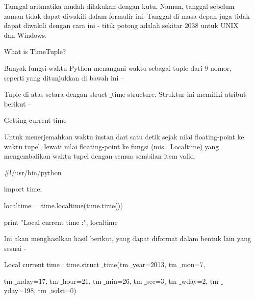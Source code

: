 \vspace{12pt}
\noindent 
Tanggal aritmatika mudah dilakukan dengan kutu. Namun, tanggal sebelum zaman tidak dapat diwakili dalam formulir ini. Tanggal di masa depan juga tidak dapat diwakili dengan cara ini - titik potong adalah sekitar 2038 untuk UNIX dan Windows. \par
\vspace{12pt}
\vspace{12pt}
\noindent 
What is TimeTuple? \par
\vspace{12pt}
\noindent 
Banyak fungsi waktu Python menangani waktu sebagai tuple dari 9 nomor, seperti yang ditunjukkan di bawah ini – \par
\vspace{12pt}
\noindent 
Tuple di atas setara dengan struct $  \_  $time structure. Struktur ini memiliki atribut berikut – \par
\vspace{12pt}
\noindent 
Getting current time \par
\noindent 
 \hspace*{0.5in} Untuk menerjemahkan waktu instan dari satu detik sejak nilai floating-point ke waktu tupel, lewati nilai floating-point ke fungsi (mis., Localtime) yang mengembalikan waktu tupel dengan semua sembilan item valid. \par
\vspace{12pt}
\noindent 
 \hspace*{0.5in}  $  \#  $!/usr/bin/python \par
\noindent 
 \hspace*{0.5in} import time; \par
\vspace{12pt}
\noindent 
 \hspace*{0.5in} localtime = time.localtime(time.time()) \par
\noindent 
 \hspace*{0.5in} print "Local current time :", localtime \par
\vspace{12pt}
\noindent 
Ini akan menghasilkan hasil berikut, yang dapat diformat dalam bentuk lain yang sesuai - \par
\noindent 
 \hspace*{0.5in} Local current time : time.struct $  \_  $time(tm $  \_  $year=2013, tm $  \_  $mon=7,  \par
\noindent 
 \hspace*{0.5in} tm $  \_  $mday=17, tm $  \_  $hour=21, tm $  \_  $min=26, tm $  \_  $sec=3, tm $  \_  $wday=2, tm $  \_  $yday=198, tm $  \_  $isdst=0) \par
